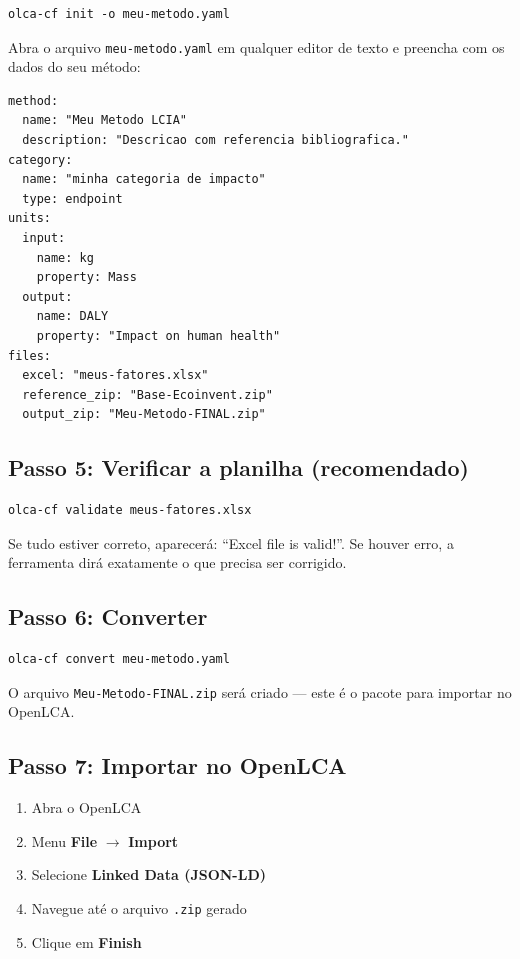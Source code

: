 \begin{lstlisting}[style=bash]
olca-cf init -o meu-metodo.yaml
\end{lstlisting}

Abra o arquivo \texttt{meu-metodo.yaml} em qualquer editor de texto e preencha com os dados do seu m\'etodo:

\begin{lstlisting}[style=yaml]
method:
  name: "Meu Metodo LCIA"
  description: "Descricao com referencia bibliografica."
category:
  name: "minha categoria de impacto"
  type: endpoint
units:
  input:
    name: kg
    property: Mass
  output:
    name: DALY
    property: "Impact on human health"
files:
  excel: "meus-fatores.xlsx"
  reference_zip: "Base-Ecoinvent.zip"
  output_zip: "Meu-Metodo-FINAL.zip"
\end{lstlisting}

\subsection{Passo 5: Verificar a planilha (recomendado)}

\begin{lstlisting}[style=bash]
olca-cf validate meus-fatores.xlsx
\end{lstlisting}

Se tudo estiver correto, aparecer\'a: ``Excel file is valid!''. Se houver erro, a ferramenta dir\'a exatamente o que precisa ser corrigido.

\subsection{Passo 6: Converter}

\begin{lstlisting}[style=bash]
olca-cf convert meu-metodo.yaml
\end{lstlisting}

O arquivo \texttt{Meu-Metodo-FINAL.zip} ser\'a criado --- este \'e o pacote para importar no OpenLCA.

\subsection{Passo 7: Importar no OpenLCA}

\begin{enumerate}
    \item Abra o OpenLCA
    \item Menu \textbf{File} $\rightarrow$ \textbf{Import}
    \item Selecione \textbf{Linked Data (JSON-LD)}
    \item Navegue at\'e o arquivo \texttt{.zip} gerado
    \item Clique em \textbf{Finish}
\end{enumerate}

